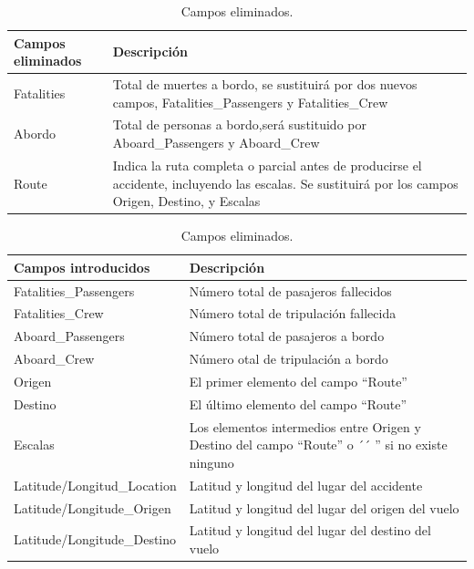 \documentclass[a4paper,10pt]{article}
\begin{document}
\singlespacing
\begin{table}[htbp]
\centering
\begin{tabular}{p{3cm} p{7cm}}
\hline \hline
Campos eliminados& Descripci\'on\\
\hline \hline
Fatalities &Total de muertes a bordo, se sustituir\'a por dos nuevos campos, Fatalities\_Passengers y Fatalities\_Crew\\
\hline
Abordo&Total de personas a bordo,ser\'a sustituido por Aboard\_Passengers y Aboard\_Crew\\
\hline
Route & Indica la ruta completa o parcial antes de producirse el accidente, incluyendo las escalas. Se sustituir\'a por los campos Origen, Destino, y Escalas\\
\hline \hline
\end{tabular}
\caption{Campos eliminados.}
\label{tabla:autores}
\end{table}
\pagebreak
\begin{table}[htbp]
\centering
\begin{tabular}{p{5cm} p{5cm}}
\hline \hline
Campos introducidos &Descripci\'on\\
\hline \hline
\hline
Fatalities\_Passengers &N\'umero total de pasajeros fallecidos\\
\hline
Fatalities\_Crew&N\'umero total de tripulaci\'on fallecida\\
\hline
Aboard\_Passengers & N\'umero total de pasajeros a bordo\\
\hline
Aboard\_Crew &N\'umero otal de tripulaci\'on a bordo\\
\hline
Origen&El primer elemento del campo ``Route''\\
\hline
Destino& El \'ultimo elemento del campo ``Route''\\
\hline
Escalas & Los elementos intermedios entre Origen y Destino del campo ``Route'' o ´´ '' si no existe ninguno\\
\hline
Latitude/Longitud\_Location & Latitud  y longitud del lugar del accidente\\
\hline
Latitude/Longitude\_Origen&Latitud  y longitud del lugar del origen del vuelo\\
\hline
Latitude/Longitude\_Destino&Latitud  y longitud del lugar del destino del vuelo\\
\hline \hline
\end{tabular}
\caption{Campos eliminados.}
\label{tabla:autores}
\end{table}
\end{document}
